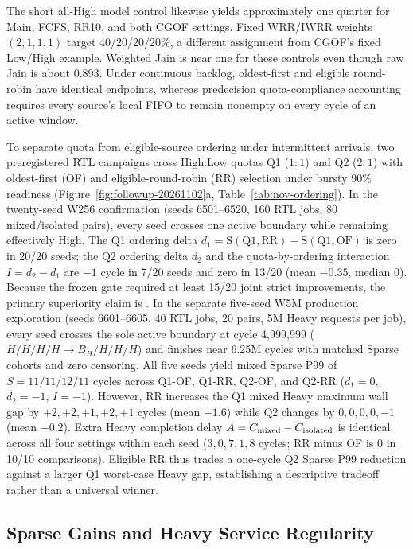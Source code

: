 The short all-High model control likewise yields approximately one quarter for Main, FCFS, RR10, and both CGOF settings. Fixed WRR/IWRR weights $(2,1,1,1)$ target 40/20/20/20\%, a different assignment from CGOF's fixed Low/High example. Weighted Jain is near one for these controls even though raw Jain is about 0.893. Under continuous backlog, oldest-first and eligible round-robin have identical endpoints, whereas predecision quota-compliance accounting requires every source's local FIFO to remain nonempty on every cycle of an active window.

To separate quota from eligible-source ordering under intermittent arrivals, two preregistered RTL campaigns cross High:Low quotas Q1 ($1:1$) and Q2 ($2:1$) with oldest-first (OF) and eligible-round-robin (RR) selection under bursty 90\% readiness (Figure~\ref{fig:followup-20261102}a, Table~\ref{tab:nov-ordering}). In the twenty-seed W256 confirmation (seeds 6501--6520, 160 RTL jobs, 80 mixed/isolated pairs), every seed crosses one active boundary while remaining effectively High. The Q1 ordering delta $d_1=\mathrm{S(Q1,RR)}-\mathrm{S(Q1,OF)}$ is zero in 20/20 seeds; the Q2 ordering delta $d_2$ and the quota-by-ordering interaction $I=d_2-d_1$ are $-1$ cycle in 7/20 seeds and zero in 13/20 (mean $-0.35$, median $0$). Because the frozen gate required at least 15/20 joint strict improvements, the primary superiority claim is . In the separate five-seed W5M production exploration (seeds 6601--6605, 40 RTL jobs, 20 pairs, 5M Heavy requests per job), every seed crosses the sole active boundary at cycle 4,999,999 ($H/H/H/H\rightarrow B_H/H/H/H$) and finishes near 6.25M cycles with matched Sparse cohorts and zero censoring. All five seeds yield mixed Sparse P99 of $S=11/11/12/11$ cycles across Q1-OF, Q1-RR, Q2-OF, and Q2-RR ($d_1=0$, $d_2=-1$, $I=-1$). However, RR increases the Q1 mixed Heavy maximum wall gap by $+2,+2,+1,+2,+1$ cycles (mean $+1.6$) while Q2 changes by $0,0,0,0,-1$ (mean $-0.2$). Extra Heavy completion delay $A=C_{\rm mixed}-C_{\rm isolated}$ is identical across all four settings within each seed ($3,0,7,1,8$ cycles; RR minus OF is $0$ in 10/10 comparisons). Eligible RR thus trades a one-cycle Q2 Sparse P99 reduction against a larger Q1 worst-case Heavy gap, establishing a descriptive tradeoff rather than a universal winner.

\subsection{Sparse Gains and Heavy Service Regularity}

